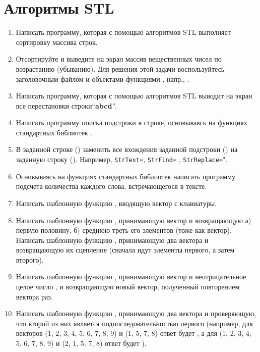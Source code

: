\section{Алгоритмы STL}
\begin{enumerate}[leftmargin=*]
    \item Написать программу, которая с помощью алгоритмов STL \monobf{[sort()]} выполняет сортировку массива строк.
    \item Отсортируйте и выведите на экран массив вещественных чисел по возрастанию (убыванию). Для решения этой задачи воспользуйтесь заголовочным файлом  и объектами-функциями , напр., .
    \item Написать программу, которая с помощью алгоритмов STL  выводит на экран все перестановки строки“\textbf{abcd}”.
    \item Написать программу поиска подстроки в строке, основываясь на функциях стандартных библиотек \monobf{[find()]}.
    \item В заданной строке () заменить все вхождения заданной подстроки () на заданную строку (). Например, \texttt{StrText=}, \texttt{StrFind=} , \texttt{StrReplace=}".
    \item Основываясь на функциях стандартных библиотек написать программу подсчета количества каждого слова, встречающегося в тексте.
    \item Написать шаблонную функцию , вводящую вектор с клавиатуры.
    \item Написать шаблонную функцию , принимающую вектор и возвращающую а) первую половину, б) среднюю треть его элементов (тоже как вектор).
    Написать шаблонную функцию , принимающую два вектора и возвращающую их сцепление (сначала идут элементы первого, а затем второго).
    \item Написать шаблонную функцию , принимающую вектор  и неотрицательное целое число , и возвращающую новый вектор, полученный повторением вектора  раз.
    \item Написать шаблонную функцию , принимающую два вектора и проверяющую, что второй из них является подпоследовательностью первого (например, для векторов (1, 2, 3, 4, 5, 6, 7, 8, 9) и (1, 5, 7, 8) ответ будет , а для (1, 2, 3, 4, 5, 6, 7, 8, 9) и (2, 1, 5, 7, 8) ответ будет ).

\end{enumerate}

